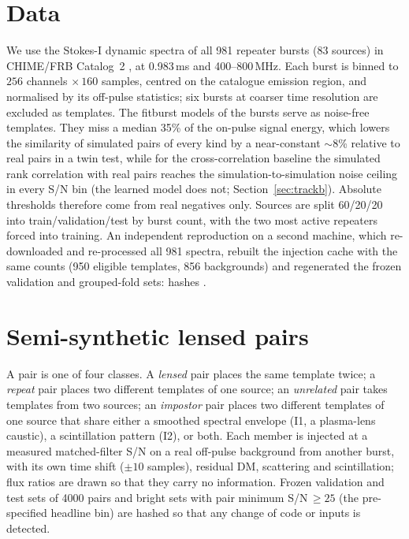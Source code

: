 \documentclass[fleqn,usenatbib]{mnras}
\begin{document}
\section{Data}
\label{sec:data}
We use the Stokes-I dynamic spectra of all 981 repeater bursts (83 sources) in CHIME/FRB Catalog~2
\citep{CHIME2025cat2}, at 0.983\,ms and 400--800\,MHz.
Each burst is binned to $256$ channels $\times\,160$ samples, centred on the catalogue emission region, and normalised by
its off-pulse statistics; six bursts at coarser time resolution are excluded as templates.
The fitburst models of the bursts serve as noise-free templates. They miss a median 35\% of the on-pulse signal energy,
which lowers the similarity of simulated pairs of every kind by a near-constant $\sim$8\% relative to real pairs in a
twin test, while for the cross-correlation baseline the simulated rank correlation with real pairs reaches the
simulation-to-simulation noise ceiling in every S/N bin (the learned model does not; Section~\ref{sec:trackb}). Absolute thresholds therefore come from real negatives only.
Sources are split 60/20/20 into train/validation/test by burst count, with the two most active repeaters forced into training.
An independent reproduction on a second machine, which re-downloaded and re-processed all 981 spectra, rebuilt the
injection cache with the same counts (950 eligible templates, 856 backgrounds) and regenerated the frozen validation
and grouped-fold sets: hashes \ReproHashes.

\section{Semi-synthetic lensed pairs}
\label{sec:pairs}
A pair is one of four classes. A \emph{lensed} pair places the same template twice; a \emph{repeat} pair places two
different templates of one source; an \emph{unrelated} pair takes templates from two sources; an \emph{impostor} pair
places two different templates of one source that share either a smoothed spectral envelope (I1, a plasma-lens caustic),
a scintillation pattern (I2), or both.
Each member is injected at a measured matched-filter S/N on a real off-pulse background from another burst, with its own
time shift ($\pm10$ samples), residual DM, scattering and scintillation; flux ratios are drawn so that they carry no information.
Frozen validation and test sets of 4000 pairs and bright sets with pair minimum S/N\,$\ge25$ (the pre-specified headline bin)
are hashed so that any change of code or inputs is detected.
\end{document}
